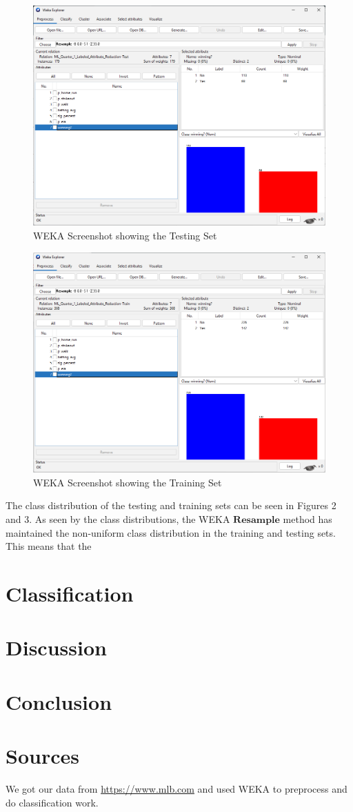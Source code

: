 \documentclass[12pt]{article}
\begin{document}
\newpage
\begin{figure}[h!]
    \includegraphics[scale=0.6]{TestSet.png}
    \caption{WEKA Screenshot showing the Testing Set}
    \label{fig:TestSet}
\end{figure}
\newpage
\begin{figure}[h!]
    \includegraphics[scale=0.6]{TrainSet.png}
    \caption{WEKA Screenshot showing the Training Set}
    \label{fig:TrainSet}
\end{figure}

The class distribution of the testing and training sets can be seen in Figures 2 and 3. As seen by the class distributions, the WEKA $\textbf{Resample}$ method has maintained the non-uniform class distribution in the training and testing sets. This means that the 

\section{Classification}

\section{Discussion}

\section{Conclusion}

\section{Sources}
We got our data from \url{https://www.mlb.com} and used WEKA to preprocess and do classification work. 
\end{document}
